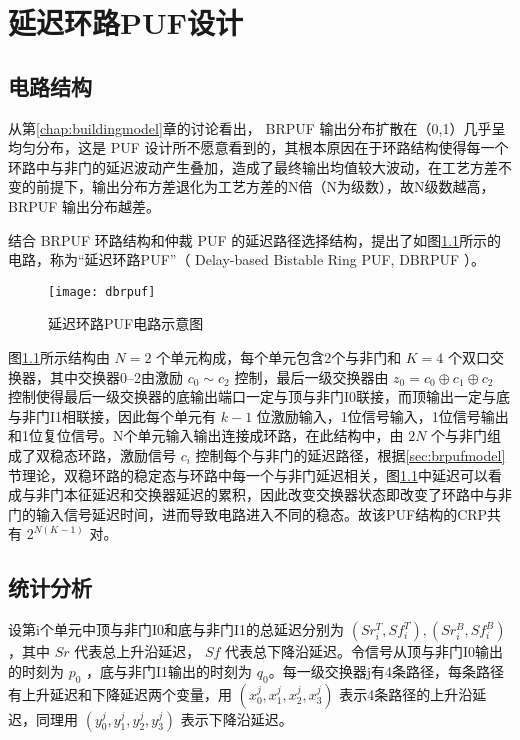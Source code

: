
\chapter{延迟环路PUF设计}\label{chap:dbrpuf}

\section{电路结构}\label{sec:dbrpuf_scheme}
从第\ref{chap:buildingmodel}章的讨论看出， BRPUF 输出分布扩散在（0,1）几乎呈均匀分布，这是 PUF 设计所不愿意看到的，其根本原因在于环路结构使得每一个环路中与非门的延迟波动产生叠加，造成了最终输出均值较大波动，在工艺方差不变的前提下，输出分布方差退化为工艺方差的N倍（N为级数），故N级数越高， BRPUF 输出分布越差。

结合 BRPUF 环路结构和仲裁 PUF 的延迟路径选择结构，提出了如图\ref{fig:dbrpuf}所示的电路，称为``延迟环路PUF''（ Delay-based Bistable Ring PUF, DBRPUF ）。

\begin{figure}[htb]
\centering
\texttt{[image: dbrpuf]}
\caption{延迟环路PUF电路示意图}
\label{fig:dbrpuf}
\end{figure}

图\ref{fig:dbrpuf}所示结构由 $ N=2 $ 个单元构成，每个单元包含2个与非门和 $ K=4 $ 个双口交换器，其中交换器0--2由激励 $ c_0\sim c_2 $ 控制，最后一级交换器由 $ z_0=c_0\oplus c_1\oplus c_2  $ 控制使得最后一级交换器的底输出端口一定与顶与非门I0联接，而顶输出一定与底与非门I1相联接，因此每个单元有 $ k-1 $ 位激励输入，1位信号输入，1位信号输出和1位复位信号。N个单元输入输出连接成环路，在此结构中，由 $ 2N $ 个与非门组成了双稳态环路，激励信号 $ c_i $ 控制每个与非门的延迟路径，根据\ref{sec:brpufmodel}节理论，双稳环路的稳定态与环路中每一个与非门延迟相关，图\ref{fig:dbrpuf}中延迟可以看成与非门本征延迟和交换器延迟的累积，因此改变交换器状态即改变了环路中与非门的输入信号延迟时间，进而导致电路进入不同的稳态。故该PUF结构的CRP共有 $ 2^{N(K-1)} $ 对。

\section{统计分析}\label{sec:dbrpuf_stat}
设第i个单元中顶与非门I0和底与非门I1的总延迟分别为 $ (Sr_i^T,Sf_i^T),(Sr_i^B,Sf_i^B) $，其中 $ Sr $ 代表总上升沿延迟， $ Sf $ 代表总下降沿延迟。令信号从顶与非门I0输出的时刻为 $ p_0 $ ，底与非门I1输出的时刻为 $ q_0 $。每一级交换器j有4条路径，每条路径有上升延迟和下降延迟两个变量，用 $ (x_0^j,x_1^j,x_2^j,x_3^j) $ 表示4条路径的上升沿延迟，同理用 $ (y_0^j,y_1^j,y_2^j,y_3^j) $ 表示下降沿延迟。

